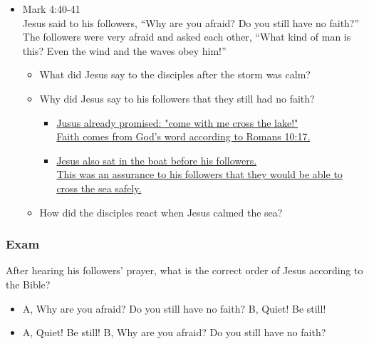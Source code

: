 \begin{itemize}
\item Mark 4:40-41\\Jesus said to his followers, “Why are you afraid? Do you still have no faith?” The followers were very afraid and asked each other, “What kind of man is this? Even the wind and the waves obey him!”
\begin{itemize}
\item What did Jesus say to the disciples after the storm was calm?
\item Why did Jesus say to his followers that they still had no faith?
\begin{itemize}
\item \underline{Jusus already promised: "come with me cross the lake!"}\\
\underline{Faith comes from God's word according to Romans 10:17.} 
\item \underline{Jesus also sat in the boat before his followers.}\\
\underline{This was an assurance to his 
followers that they would be able to cross the sea safely.}
\end{itemize}

\item How did the disciples react when Jesus calmed the sea?
\end{itemize}
\end{itemize}

\subsubsection{Exam}
After hearing his followers' prayer, what is the correct order of Jesus according to the Bible?
\begin{itemize}
\item A, Why are you afraid? Do you still have no faith? \hspace{1.cm} B, Quiet! Be still!
\item A, Quiet! Be still! \hspace{1.cm} B, Why are you afraid? Do you still have no faith?
\end{itemize}


